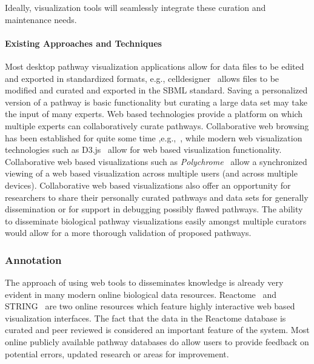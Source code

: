 \documentclass[twocolumn]{bmcart}%
\begin{document}
Ideally, visualization tools will seamlessly integrate these curation and maintenance needs.

\paragraph*{Existing Approaches and Techniques}
Most desktop pathway visualization applications allow for data files to be edited and exported in standardized formats, e.g., celldesigner~\cite{funahashi2008celldesigner} allows files to be modified and curated and exported in the SBML standard.
Saving a  personalized version of a pathway is basic functionality but curating a large data set may take the input of many experts.
Web based technologies provide a platform on which multiple experts can collaboratively curate pathways.
Collaborative web browsing has been established for quite some time ,e.g.,~\cite{esenther2002instant}, while
modern web visualization technologies such as D3.js~\cite{bostock2011d3} allow for web based visualization functionality.
Collaborative web based visualizations such as \textit{Polychrome}~\cite{badam2014polychrome} allow a synchronized viewing of a web based visualization across multiple users (and across multiple devices).
Collaborative web based visualizations also offer an opportunity for researchers to share their personally curated pathways and data sets for generally dissemination or for support in debugging possibly flawed pathways.
The ability to disseminate biological pathway visualizations easily amongst multiple curators would allow for a more thorough validation of proposed pathways.



\subsubsection*{Annotation}

The approach of using web tools to disseminates knowledge is already very evident in many modern online biological data resources.
Reactome~\cite{croft2014reactome} and STRING~\cite{STRING2005} are two online resources which feature highly interactive web based visualization interfaces.
The fact that the data in the Reactome database is curated and peer reviewed is considered an important feature of the system.
Most online publicly available pathway databases do allow users to provide feedback on potential errors, updated research or areas for improvement.
\end{document}
